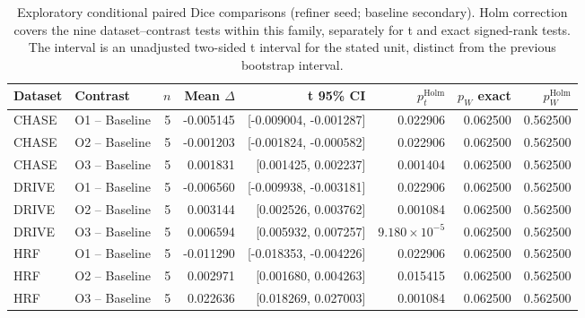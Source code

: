 \begin{table}[p]
\caption{Exploratory conditional paired Dice comparisons (refiner seed; baseline secondary). Holm correction covers the nine dataset--contrast tests within this family, separately for t and exact signed-rank tests. The interval is an unadjusted two-sided t interval for the stated unit, distinct from the previous bootstrap interval.}\label{tab:completion-refiner_seed-baseline_secondary}
\centering\scriptsize\setlength{\tabcolsep}{3pt}
\begin{tabular}{llrrrrrr}
\toprule
Dataset & Contrast & $n$ & Mean $\Delta$ & t 95\% CI & $p_t^{\mathrm{Holm}}$ & $p_W$ exact & $p_W^{\mathrm{Holm}}$ \\
\midrule
CHASE & O1 -- Baseline & 5 & -0.005145 & [-0.009004, -0.001287] & 0.022906 & 0.062500 & 0.562500 \\
CHASE & O2 -- Baseline & 5 & -0.001203 & [-0.001824, -0.000582] & 0.022906 & 0.062500 & 0.562500 \\
CHASE & O3 -- Baseline & 5 & 0.001831 & [0.001425, 0.002237] & 0.001404 & 0.062500 & 0.562500 \\
DRIVE & O1 -- Baseline & 5 & -0.006560 & [-0.009938, -0.003181] & 0.022906 & 0.062500 & 0.562500 \\
DRIVE & O2 -- Baseline & 5 & 0.003144 & [0.002526, 0.003762] & 0.001084 & 0.062500 & 0.562500 \\
DRIVE & O3 -- Baseline & 5 & 0.006594 & [0.005932, 0.007257] & $9.180\times10^{-5}$ & 0.062500 & 0.562500 \\
HRF & O1 -- Baseline & 5 & -0.011290 & [-0.018353, -0.004226] & 0.022906 & 0.062500 & 0.562500 \\
HRF & O2 -- Baseline & 5 & 0.002971 & [0.001680, 0.004263] & 0.015415 & 0.062500 & 0.562500 \\
HRF & O3 -- Baseline & 5 & 0.022636 & [0.018269, 0.027003] & 0.001084 & 0.062500 & 0.562500 \\
\bottomrule
\end{tabular}
\end{table}

